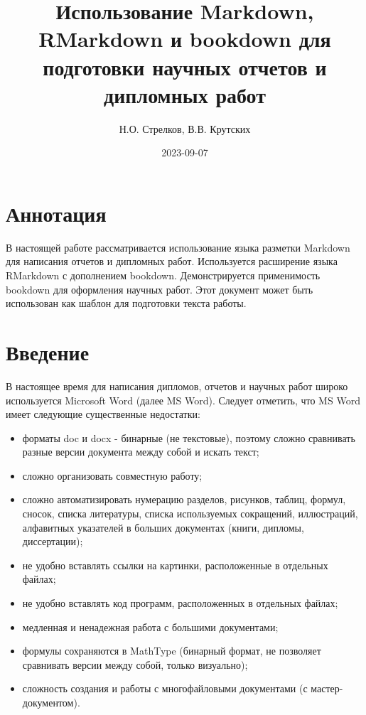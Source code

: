 \documentclass[
  a4paper,
]{book}
\title{Использование Markdown, RMarkdown и bookdown для подготовки научных отчетов и дипломных работ}
\author{Н.О. Стрелков, В.В. Крутских}
\date{2023-09-07}
\providecommand{\tightlist}{%
  \setlength{\itemsep}{0pt}\setlength{\parskip}{0pt}}
\theoremstyle{definition}
\theoremstyle{definition}
\theoremstyle{definition}
\theoremstyle{definition}
\theoremstyle{remark}
\begin{document}
\maketitle


\renewcommand*\contentsname{Содержание}
{
\setcounter{tocdepth}{4}
\tableofcontents
}
\hypertarget{abstract}{%
\chapter*{Аннотация}\label{abstract}}

В настоящей работе рассматривается использование языка разметки Markdown для написания отчетов и дипломных работ. Используется расширение языка RMarkdown с дополнением bookdown. Демонстрируется применимость bookdown для оформления научных работ. Этот документ может быть использован как шаблон для подготовки текста работы.

\hypertarget{intro}{%
\chapter*{Введение}\label{intro}}

В настоящее время для написания дипломов, отчетов и научных работ широко используется Microsoft Word (далее MS Word). Следует отметить, что MS Word имеет следующие существенные недостатки:

\begin{itemize}
\tightlist
\item
  форматы doc и docx - бинарные (не текстовые), поэтому сложно сравнивать разные версии документа между собой и искать текст;
\item
  сложно организовать совместную работу;
\item
  сложно автоматизировать нумерацию разделов, рисунков, таблиц, формул, сносок, списка литературы, списка используемых сокращений, иллюстраций, алфавитных указателей в больших документах (книги, дипломы, диссертации);
\item
  не удобно вставлять ссылки на картинки, расположенные в отдельных файлах;
\item
  не удобно вставлять код программ, расположенных в отдельных файлах;
\item
  медленная и ненадежная работа с большими документами;
\item
  формулы сохраняются в MathType (бинарный формат, не позволяет сравнивать версии между собой, только визуально);
\item
  сложность создания и работы с многофайловыми документами (с мастер-документом).
\end{itemize}
\end{document}
